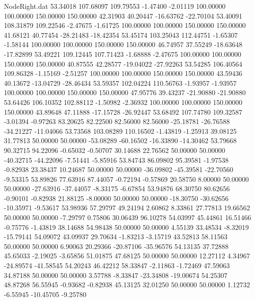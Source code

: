\begin{filecontents}{NodeRight.dat}
  53.34018  107.68097  109.79553    -1.47400   -2.01119  100.00000  100.00000  150.00000  150.00000   42.31903   40.20447  -16.63762  -22.70104
  53.40091  108.31879  109.22546    -2.47675   -1.61725  100.00000  100.00000  150.00000  150.00000   41.68121   40.77454  -28.21483  -18.42354
  53.45174  103.25043  112.44751    -1.65307   -1.58144  100.00000  100.00000  150.00000  150.00000   46.74957   37.55249  -18.63648  -17.82899
  53.49221  109.12445  107.71423    -1.68888   -2.47675  100.00000  100.00000  150.00000  150.00000   40.87555   42.28577  -19.04022  -27.92263
  53.54285  106.40564  109.86328    -1.15169   -2.51257  100.00000  100.00000  150.00000  150.00000   43.59436   40.13672  -13.04729  -28.46434
  53.59357  102.04224  110.56763    -1.93957   -1.93957  100.00000  100.00000  150.00000  150.00000   47.95776   39.43237  -21.90880  -21.90880
  53.64426  106.10352  102.88112    -1.50982   -2.36932  100.00000  100.00000  150.00000  150.00000   43.89648   47.11888  -17.15728  -26.92447
  53.68492  107.74780  109.32587    -3.01394   -0.97263   83.20625   82.22500   82.56000   82.56000  -25.18781  -26.76588  -34.21227  -11.04066
  53.73568  103.08289  110.16502    -1.43819   -1.25913   39.08125   31.77813   50.00000   50.00000  -53.08289  -60.16502  -16.33890  -14.30462
  53.79668   90.32715   94.22096    -0.65032   -0.50707   30.14688   22.76562   50.00000   50.00000  -40.32715  -44.22096   -7.51441   -5.85916
  53.84743   86.09802   95.39581    -1.97538   -0.82938   23.38437   10.24687   50.00000   50.00000  -36.09802  -45.39581  -22.70560   -9.53315
  53.89826   77.63916   87.44057    -0.72194   -0.57869   20.58750    8.00000   50.00000   50.00000  -27.63916  -37.44057   -8.33175   -6.67854
  53.94876   68.30750   80.62656    -0.90101   -0.82938   21.88125   -8.00000   50.00000   50.00000  -18.30750  -30.62656  -10.35971   -9.53617
  53.98936   57.29797   49.24194     2.60862    8.33861   27.77813   19.66562   50.00000   50.00000   -7.29797    0.75806   30.06439   96.10278
  54.03997   45.44861   16.51466    -0.75776   -1.43819   38.14688   54.98438   50.00000   50.00000    4.55139   33.48534   -8.32019  -15.79141
  54.09072   43.09937   29.70634    -1.83213   -3.15719   43.52813   58.11563   50.00000   50.00000    6.90063   20.29366  -20.87106  -35.96576
  54.13135   37.72888   45.65033    -2.19025   -3.65856   51.01875   47.68125   50.00000   50.00000   12.27112    4.34967  -24.89574  -41.58545
  54.20243   46.42212   58.33847    -2.11863   -1.72469   47.59063   34.87188   50.00000   50.00000    3.57788   -8.33847  -23.34808  -19.00674
  54.25307   48.87268   56.55945    -0.93682   -0.82938   45.13125   32.01250   50.00000   50.00000    1.12732   -6.55945  -10.45705   -9.25780

\end{filecontents}
